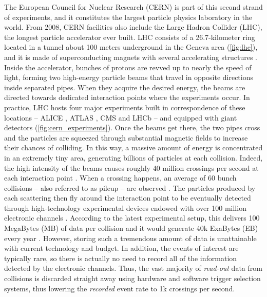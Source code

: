 The European Council for Nuclear Research (CERN) is part of this second strand of experiments, and it constitutes the largest particle physics laboratory in the world.
From 2008, CERN facilities also include the Large Hadron Collider (LHC), the longest particle accelerator ever built.
LHC consists of a \mbox{26.7-kilometer} ring located in a tunnel about 100 meters underground in the Geneva area (\cref{fig:lhc}), and it is made of superconducting magnets with several accelerating structures \cite{lhcwebsite}.
Inside the accelerator, bunches of protons are revved up to nearly the speed of light, forming two high-energy particle beams that travel in opposite directions inside separated pipes. 
When they acquire the desired energy, the beams are directed towards dedicated interaction points where the experiments occur. %
In practice, LHC hosts four major experiments built in correspondence of these locations -- ALICE \cite{aamodt2008alice}, ATLAS \cite{aad2008atlas}, CMS \cite{collaboration2008cms} and LHCb \cite{alves2008lhcb} -- and equipped with giant detectors (\cref{fig:cern_experiments}).
Once the beams get there, the two pipes cross and the particles are squeezed through substantial magnetic fields to increase their chances of colliding. 
In this way, a massive amount of energy is concentrated in an extremely tiny area, generating billions of particles at each collision.
Indeed, the high intensity of the beams causes roughly 40 million crossings per second at each interaction point \cite{albrecht2019roadmap, grandi2017HEPsize}. 
When a crossing happens, an average of 60 bunch collisions -- also referred to as pileup -- are observed \cite{albrecht2019roadmap}. The particles produced by each scattering then fly around the interaction point to be eventually detected through high-technology experimental devices endowed with over 100 million electronic channels \cite{grandi2017HEPsize, aad2020channels}.
According to the latest experimental setup, this delivers 100 MegaBytes (MB) of data per collision and it would generate 40k ExaBytes (EB) every year \cite{grandi2017HEPsize}.
However, storing such a tremendous amount of data is unattainable with current technology and budget. In addition, the events of interest are typically rare, so there is actually no need to record all of the information detected by the electronic channels.
Thus, the vast majority of \emph{read-out} data from collisions is discarded straight away using hardware and software trigger selection systems, thus lowering the \emph{recorded} event rate to 1k crossings per second. 
